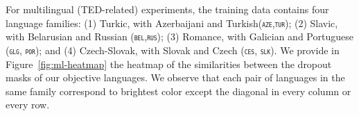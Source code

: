 \documentclass[11pt]{article}
\newcommand{\domain}[1]{\texttt{\textsc{#1}}}
\newcommand{\SB}[1]{\textbf{#1}}
\begin{document}
For multilingual (TED-related) experiments, the training data contains four language families: (1) Turkic, with Azerbaijani and Turkish(\domain{aze},\domain{tur}); (2) Slavic, with Belarusian and Russian (\domain{bel},\domain{rus}); (3) Romance, with Galician and Portuguese (\domain{glg}, \domain{por}); and (4) Czech-Slovak, with Slovak and Czech (\domain{ces}, \domain{slk}). We provide in Figure~\ref{fig:ml-heatmap} the heatmap of the similarities between the dropout masks of our objective languages. We observe that each pair of languages in the same family correspond to brightest color except the diagonal in every column or every row.
\end{document}
